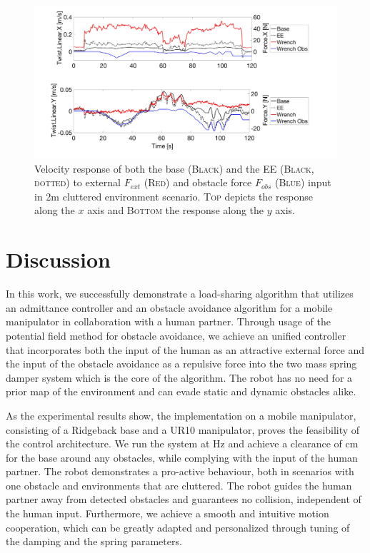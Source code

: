 \begin{figure}
   \centering
   \includegraphics[width=\textwidth]{images/test15_response.jpg}
   \caption{Velocity response of both the base (\textsc{Black}) and the EE (\textsc{Black, dotted}) to external $F_{ext }$ (\textsc{Red}) and obstacle force $F_{obs}$ (\textsc{Blue}) input in \unit{2}{m} cluttered environment scenario. \textsc{Top} depicts the response along the $x$ axis and \textsc{Bottom} the response along the $y$ axis.}
   \label{pics:test15}
\end{figure}

\chapter{Discussion}
In this work, we successfully demonstrate a load-sharing algorithm that utilizes an admittance controller and an obstacle avoidance algorithm for a mobile manipulator in collaboration with a human partner. Through usage of the potential field method for obstacle avoidance, we achieve an unified controller that incorporates both the input of the human as an attractive external force and the input of the obstacle avoidance as a repulsive force into the two mass spring damper system which is the core of the algorithm. The robot has no need for a prior map of the environment and can evade static and dynamic obstacles alike.

As the experimental results show, the implementation on a mobile manipulator, consisting of a Ridgeback base and a UR10 manipulator, proves the feasibility of the control architecture. We run the system at \unit[125]{Hz} and achieve a clearance of \unit[12]{cm} for the base around any obstacles, while complying with the input of the human partner. The robot demonstrates a pro-active behaviour, both in scenarios with one obstacle and environments that are cluttered. The robot guides the human partner away from detected obstacles and guarantees no collision, independent of the human input. Furthermore, we achieve a smooth and intuitive motion cooperation, which can be greatly adapted and personalized through tuning of the damping and the spring parameters.

